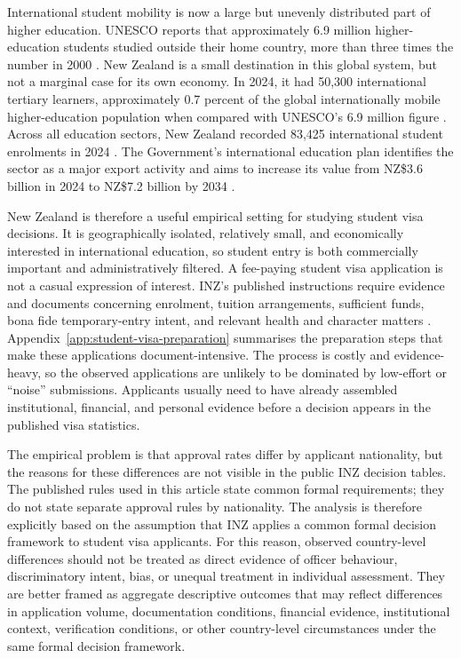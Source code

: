 \documentclass[runningheads]{llncs}
\begin{document}
International student mobility is now a large but unevenly distributed part of higher education. UNESCO reports that approximately 6.9 million higher-education students studied outside their home country, more than three times the number in 2000 \cite{UNESCO2025}. New Zealand is a small destination in this global system, but not a marginal case for its own economy. In 2024, it had 50,300 international tertiary learners, approximately 0.7 percent of the global internationally mobile higher-education population when compared with UNESCO's 6.9 million figure \cite{TEC2024Snapshot,UNESCO2025}. Across all education sectors, New Zealand recorded 83,425 international student enrolments in 2024 \cite{ENZ2025Enrolments}. The Government's international education plan identifies the sector as a major export activity and aims to increase its value from NZ\$3.6 billion in 2024 to NZ\$7.2 billion by 2034 \cite{MoEInternationalEducation}.

New Zealand is therefore a useful empirical setting for studying student visa decisions. It is geographically isolated, relatively small, and economically interested in international education, so student entry is both commercially important and administratively filtered. A fee-paying student visa application is not a casual expression of interest. INZ's published instructions require evidence and documents concerning enrolment, tuition arrangements, sufficient funds, bona fide temporary-entry intent, and relevant health and character matters \cite{INZEvidence}. Appendix~\ref{app:student-visa-preparation} summarises the preparation steps that make these applications document-intensive. The process is costly and evidence-heavy, so the observed applications are unlikely to be dominated by low-effort or ``noise'' submissions. Applicants usually need to have already assembled institutional, financial, and personal evidence before a decision appears in the published visa statistics.

The empirical problem is that approval rates differ by applicant nationality, but the reasons for these differences are not visible in the public INZ decision tables. The published rules used in this article state common formal requirements; they do not state separate approval rules by nationality. The analysis is therefore explicitly based on the assumption that INZ applies a common formal decision framework to student visa applicants. For this reason, observed country-level differences should not be treated as direct evidence of officer behaviour, discriminatory intent, bias, or unequal treatment in individual assessment. They are better framed as aggregate descriptive outcomes that may reflect differences in application volume, documentation conditions, financial evidence, institutional context, verification conditions, or other country-level circumstances under the same formal decision framework.
\end{document}
